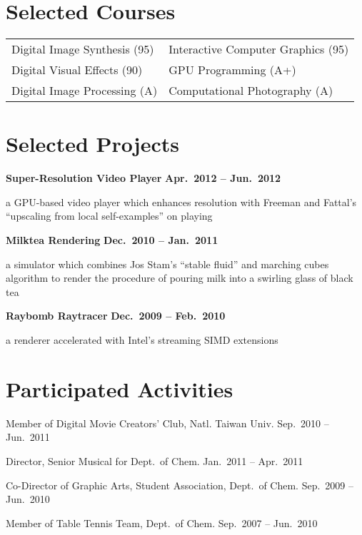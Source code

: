 \documentclass[margin,line, 11pt, a4paper]{res}
\begin{document}
\begin{resume}
\section{\sc Selected Courses}
\begin{tabular}{p{2.5in}p{2.5in}}
 Digital Image Synthesis (95) & Interactive Computer Graphics (95)\\
 Digital Visual Effects (90) & GPU Programming (A+) \\
 Digital Image Processing (A) & Computational Photography (A)
\end{tabular}

\section{\sc Selected Projects}
{\bf Super-Resolution Video Player} \hfill {\bf Apr.~2012 -- Jun.~2012}

{\small a GPU-based video player which enhances resolution with Freeman and Fattal's ``upscaling from local self-examples'' on playing}

{\bf Milktea Rendering} \hfill {\bf Dec.~2010 -- Jan.~2011}

{\small a simulator which combines Jos Stam's ``stable fluid'' and marching cubes algorithm to render the procedure of pouring milk into a swirling glass of black tea}

{\bf Raybomb Raytracer} \hfill {\bf Dec.~2009 -- Feb.~2010}

{\small a renderer accelerated with Intel's streaming SIMD extensions}

\section{\sc Participated Activities}
{\small
Member of Digital Movie Creators' Club, Natl. Taiwan Univ. \hfill Sep.~2010 -- Jun.~2011

Director, Senior Musical for Dept.~of Chem. \hfill Jan.~2011 -- Apr.~2011

Co-Director of Graphic Arts, Student Association, Dept.~of Chem. \hfill Sep.~2009 -- Jun.~2010

Member of Table Tennis Team, Dept.~of Chem. \hfill Sep.~2007 -- Jun.~2010

}
\end{resume}
\end{document}
